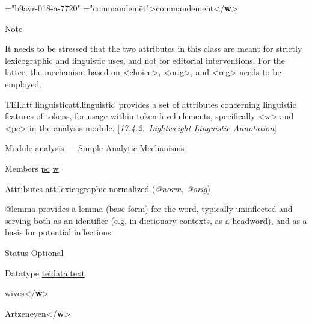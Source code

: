 \begin{reflist}
\begin{sansreflist}
\begin{reflist}
{\hspace*{1em}{xml:id}="{b9avr-018-a-7720}"\mbox{}\newline 
\hspace*{1em}{orig}="{commandemēt}">}commandement{</\textbf{w}>}
\end{reflist}  
\end{sansreflist}  
    \item[{Note}]
  \par
It needs to be stressed that the two attributes in this class are meant for strictly lexicographic and linguistic uses, and not for editorial interventions. For the latter, the mechanism based on \hyperref[TEI.choice]{<choice>}, \hyperref[TEI.orig]{<orig>}, and \hyperref[TEI.reg]{<reg>} needs to be employed.
\end{reflist}  
\begin{reflist}
\item[]\begin{specHead}{TEI.att.linguistic}{att.linguistic} provides a set of attributes concerning linguistic features of tokens, for usage within token-level elements, specifically \hyperref[TEI.w]{<w>} and \hyperref[TEI.pc]{<pc>} in the analysis module. [\textit{\hyperref[AILALW]{17.4.2.\ Lightweight Linguistic Annotation}}]\end{specHead} 
    \item[{Module}]
  analysis — \hyperref[AI]{Simple Analytic Mechanisms}
    \item[{Members}]
  \hyperref[TEI.pc]{pc} \hyperref[TEI.w]{w}
    \item[{Attributes}]
  \hyperref[TEI.att.lexicographic.normalized]{att.lexicographic.normalized} (\textit{@norm}, \textit{@orig}) \hfil\\[-10pt]\begin{sansreflist}
    \item[@lemma]
  provides a lemma (base form) for the word, typically uninflected and serving both as an identifier (e.g. in dictionary contexts, as a headword), and as a basis for potential inflections.
\begin{reflist}
    \item[{Status}]
  Optional
    \item[{Datatype}]
  \hyperref[TEI.teidata.text]{teidata.text}
    \item[]wives{</\textbf{w}>}
    \item[]Artzeneyen{</\textbf{w}>}

\end{reflist}
\end{sansreflist}
\end{reflist}
